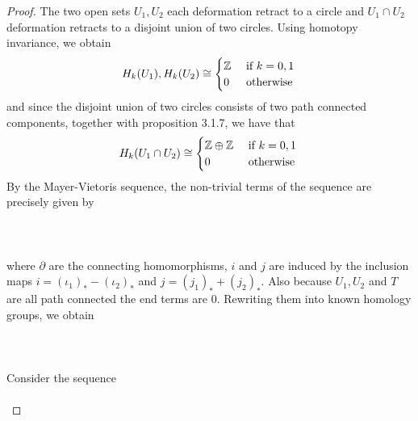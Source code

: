 \documentclass[a4paper]{article}
\begin{document}
\begin{eg}{}{}
\begin{proof}
The two open sets $U_1,U_2$ each deformation retract to a circle and $U_1\cap U_2$ deformation retracts to a disjoint union of two circles. Using homotopy invariance, we obtain $$H_k(U_1),H_k(U_2)\cong\begin{cases}
\mathbb{Z} & \text{ if } k=0,1\\
0 & \text{ otherwise }
\end{cases}$$ and since the disjoint union of two circles consists of two path connected components, together with proposition 3.1.7, we have that $$H_k(U_1\cap U_2)\cong\begin{cases}
\mathbb{Z}\oplus\mathbb{Z} & \text{ if } k=0,1\\
0 & \text{ otherwise }
\end{cases}$$
By the Mayer-Vietoris sequence, the non-trivial terms of the sequence are precisely given by \\~\\
\\~\\
where $\partial$ are the connecting homomorphisms, $i$ and $j$ are induced by the inclusion maps $i=(\iota_1)_\ast-(\iota_2)_\ast$ and $j=(j_1)_\ast+(j_2)_\ast$. Also because $U_1,U_2$ and $T$ are all path connected the end terms are $0$. Rewriting them into known homology groups, we obtain \\~\\
\\~\\
Consider the sequence \\~\\
\end{proof}
\end{eg}
\end{document}
